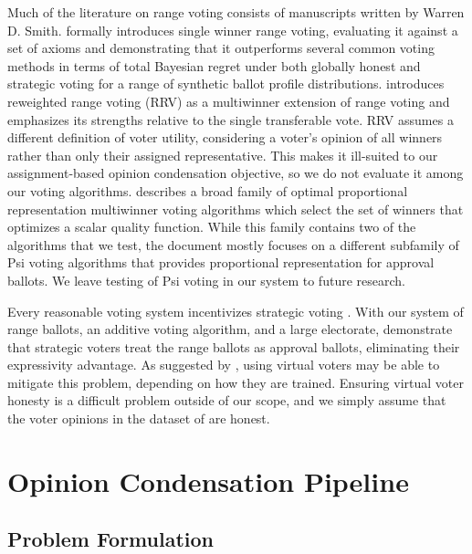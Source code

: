 \documentclass[11pt]{article}
\begin{document}
Much of the literature on range voting consists of manuscripts written by Warren D. Smith. \citet{rangevoting-range-voting} formally introduces single winner range voting, evaluating it against a set of axioms and demonstrating that it outperforms several common voting methods in terms of total Bayesian regret under both globally honest and strategic voting for a range of synthetic ballot profile distributions. \citet{rangevoting-rrv} introduces reweighted range voting (RRV) as a multiwinner extension of range voting and emphasizes its strengths relative to the single transferable vote. RRV assumes a different definition of voter utility, considering a voter's opinion of all winners rather than only their assigned representative. This makes it ill-suited to our assignment-based opinion condensation objective, so we do not evaluate it among our voting algorithms. \citet{rangevoting-optimal-pr} describes a broad family of optimal proportional representation multiwinner voting algorithms which select the set of winners that optimizes a scalar quality function. While this family contains two of the algorithms that we test, the document mostly focuses on a different subfamily of Psi voting algorithms that provides proportional representation for approval ballots. We leave testing of Psi voting in our system to future research.

Every reasonable voting system incentivizes strategic voting \citep{gibbards-theorem}. With our system of range ballots, an additive voting algorithm, and a large electorate, \citet{preference-overstating} demonstrate that strategic voters treat the range ballots as approval ballots, eliminating their expressivity advantage. As suggested by \citet{rangevoting-range-voting, newberry-moral-parliaments}, using virtual voters may be able to mitigate this problem, depending on how they are trained. Ensuring virtual voter honesty is a difficult problem outside of our scope, and we simply assume that the voter opinions in the dataset of \citet{fish-v2} are honest.


\section{Opinion Condensation Pipeline}

\subsection{Problem Formulation}
\label{sec:problem-formulation}
\end{document}
